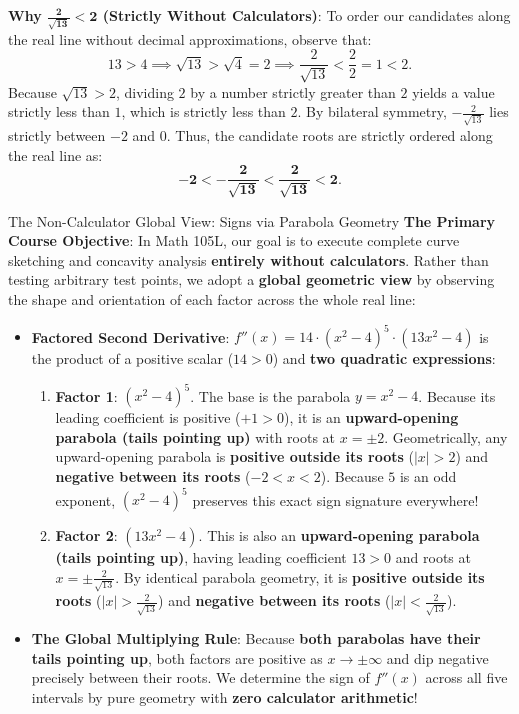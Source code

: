 \documentclass[11pt]{article}
\begin{document}
\textbf{Why $\mathbf{\frac{2}{\sqrt{13}} < 2}$ (Strictly Without Calculators)}:
To order our candidates along the real line without decimal approximations, observe that:
\[
13 > 4 \implies \sqrt{13} > \sqrt{4} = 2 \implies \frac{2}{\sqrt{13}} < \frac{2}{2} = 1 < 2.
\]
Because $\sqrt{13} > 2$, dividing $2$ by a number strictly greater than $2$ yields a value strictly less than $1$, which is strictly less than $2$. By bilateral symmetry, $-\frac{2}{\sqrt{13}}$ lies strictly between $-2$ and $0$.
Thus, the candidate roots are strictly ordered along the real line as:
\[
\mathbf{-2 < -\frac{2}{\sqrt{13}} < \frac{2}{\sqrt{13}} < 2}.
\]

\vspace{3pt}
\begin{geombox}{The Non-Calculator Global View: Signs via Parabola Geometry}
\textbf{The Primary Course Objective}: In Math 105L, our goal is to execute complete curve sketching and concavity analysis \textbf{entirely without calculators}. Rather than testing arbitrary test points, we adopt a \textbf{global geometric view} by observing the shape and orientation of each factor across the whole real line:
\begin{itemize}[leftmargin=1.2em, itemsep=2pt, topsep=1.5pt]
  \item \textbf{Factored Second Derivative}: $f''(x) = 14 \cdot (x^2 - 4)^5 \cdot (13x^2 - 4)$ is the product of a positive scalar ($14 > 0$) and \textbf{two quadratic expressions}:
  \begin{enumerate}[leftmargin=1.3em, itemsep=1.5pt]
    \item \textbf{Factor 1}: $(x^2 - 4)^5$. The base is the parabola $y = x^2 - 4$. Because its leading coefficient is positive ($+1 > 0$), it is an \textbf{upward-opening parabola (tails pointing up)} with roots at $x = \pm 2$. Geometrically, any upward-opening parabola is \textbf{positive outside its roots} ($|x| > 2$) and \textbf{negative between its roots} ($-2 < x < 2$). Because $5$ is an odd exponent, $(x^2 - 4)^5$ preserves this exact sign signature everywhere!
    \item \textbf{Factor 2}: $(13x^2 - 4)$. This is also an \textbf{upward-opening parabola (tails pointing up)}, having leading coefficient $13 > 0$ and roots at $x = \pm \frac{2}{\sqrt{13}}$. By identical parabola geometry, it is \textbf{positive outside its roots} ($|x| > \frac{2}{\sqrt{13}}$) and \textbf{negative between its roots} ($|x| < \frac{2}{\sqrt{13}}$).
  \end{enumerate}
  \item \textbf{The Global Multiplying Rule}: Because \textbf{both parabolas have their tails pointing up}, both factors are positive as $x \to \pm\infty$ and dip negative precisely between their roots. We determine the sign of $f''(x)$ across all five intervals by pure geometry with \textbf{zero calculator arithmetic}!
\end{itemize}
\end{geombox}
\end{document}
